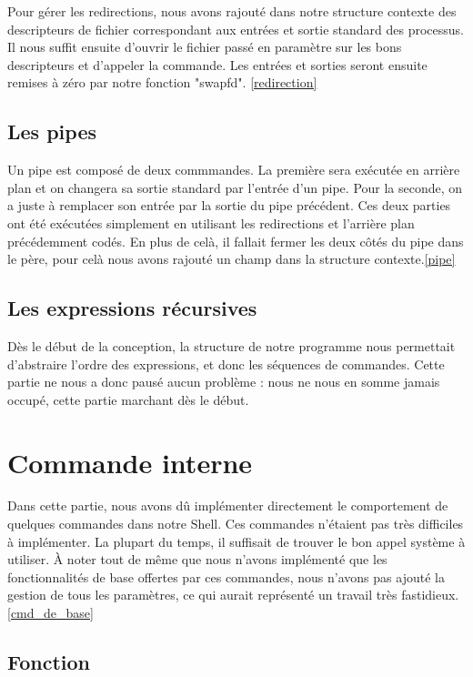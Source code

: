 \documentclass[12pt]{article}
\begin{document}
Pour gérer les redirections, nous avons rajouté dans notre structure contexte des descripteurs
de fichier correspondant aux entrées et sortie standard des processus. Il nous suffit ensuite 
d'ouvrir le fichier passé en paramètre sur les bons descripteurs et d'appeler la commande.
Les entrées et sorties seront ensuite remises à zéro par notre fonction "swapfd". \ref{redirection}

\subsection{Les pipes}

Un pipe est composé de deux commmandes. La première sera exécutée en arrière plan et on changera
sa sortie standard par l'entrée d'un pipe. Pour la seconde, on a juste à remplacer son entrée par
la sortie du pipe précédent. Ces deux parties ont été exécutées simplement en utilisant les
redirections et l'arrière plan précédemment codés. En plus de celà, il fallait fermer les deux
côtés du pipe dans le père, pour celà nous avons rajouté un champ dans la structure contexte.\ref{pipe}


\subsection{Les expressions récursives}

Dès le début de la conception, la structure de notre programme nous permettait d'abstraire l'ordre
des expressions, et donc les séquences de commandes. Cette partie ne nous a donc pausé aucun problème :
nous ne nous en somme jamais occupé, cette partie marchant dès le début.


\newpage
\section{Commande interne}

Dans cette partie, nous avons dû implémenter directement le comportement de quelques
commandes dans notre Shell. Ces commandes n'étaient pas très difficiles à implémenter. La plupart
du temps, il suffisait de trouver le bon appel système à utiliser. À noter tout de même
que nous n'avons implémenté que les fonctionnalités de base offertes par ces commandes, nous n'avons pas ajouté la gestion de tous les paramètres, ce qui aurait 
représenté un travail très fastidieux.\ref{cmd_de_base}

\subsection{Fonction}
\end{document}
